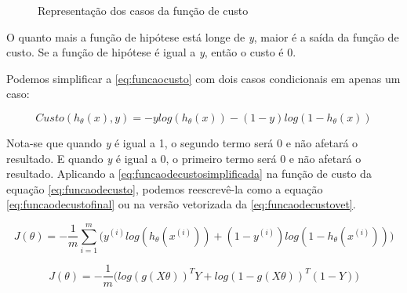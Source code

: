 \begin{figure}[!htb]
  \caption{Representação dos casos da função de custo}
  \label{fig:logfunctions}
  \begin{center}
  \end{center}
\end{figure}


O quanto mais a função de hipótese está longe de \textit{y}, maior é a saída da função de custo. Se a função de hipótese é igual a \textit{y}, então o custo é 0.

Podemos simplificar a \autoref{eq:funcaocusto} com dois casos condicionais em apenas um caso:

\begin{equation} 
\label{eq:funcaodecustosimplificada}
Custo(h_{\theta}(x), y) = -ylog(h_{\theta}(x)) - (1-y)log(1 - h_{\theta}(x))
\end{equation}

Nota-se que quando \textit{y} é igual a 1, o segundo termo será 0 e não afetará o resultado. E quando \textit{y} é igual a 0, o primeiro termo será 0 e não afetará o resultado. Aplicando a \autoref{eq:funcaodecustosimplificada} na função de custo da equação \autoref{eq:funcaodecusto}, podemos reescrevê-la como a equação \autoref{eq:funcaodecustofinal} ou na versão vetorizada da \autoref{eq:funcaodecustovet}.

\begin{equation}
\label{eq:funcaodecustofinal}
J(\theta) = - \frac{1}{m}\sum\limits_{i=1}^{m}\Big( y^{(i)}log(h_{\theta}(x^{(i)})) + (1-y^{(i)})log(1 - h_{\theta}(x^{(i)})) \Big)
\end{equation}

\begin{equation}
J(\theta) = - \frac{1}{m}\Big( log(g(X\theta))^TY + log(1 - g(X\theta))^T(1 - Y) \Big) \label{eq:funcaodecustovet}
\end{equation}

